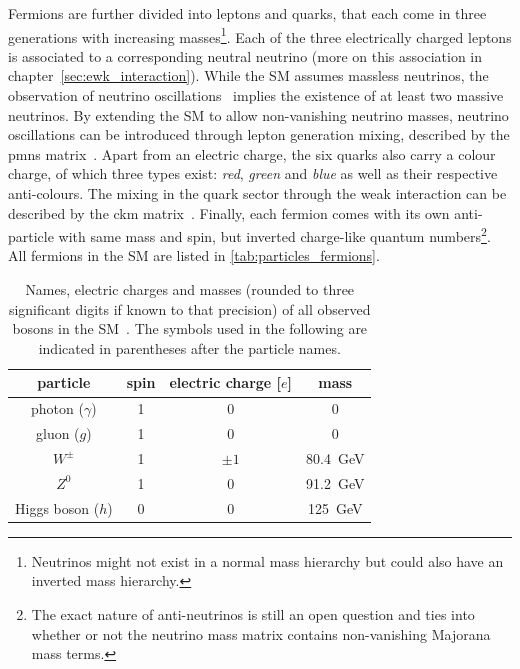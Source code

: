 
Fermions are further divided into leptons and quarks, that each come in three generations with increasing masses\footnote{Neutrinos might not exist in a normal mass hierarchy but could also have an inverted mass hierarchy.}.
Each of the three electrically charged leptons is associated to a corresponding neutral neutrino (more on this association in chapter~\cref{sec:ewk_interaction}). While the SM assumes massless neutrinos, the observation of neutrino oscillations~\cite{Fukuda:1998mi} implies the existence of at least two massive neutrinos.
By extending the SM to allow non-vanishing neutrino masses, neutrino oscillations can be introduced through lepton generation mixing, described by the \gls{pmns} matrix~\cite{PMNS:1962mu}.
Apart from an electric charge, the six quarks also carry a colour charge, of which three types exist: \textit{red}, \textit{green} and \textit{blue} as well as their respective anti-colours.
The mixing in the quark sector through the weak interaction can be described by the \gls{ckm} matrix~\cite{PhysRevLett.10.531,CKM:1973fv}.
Finally, each fermion comes with its own anti-particle with same mass and spin, but inverted charge-like quantum numbers\footnote{The exact nature of anti-neutrinos is still an open question and ties into whether or not the neutrino mass matrix contains non-vanishing Majorana mass terms.}.
All fermions in the SM are listed in \cref{tab:particles_fermions}.


\begin{table}
	\centering
	\setlength\heavyrulewidth{0.2ex}
	\small
	\caption{Names, electric charges and masses (rounded to three significant digits if known to that precision) of all observed bosons in the SM~\cite{pdg2020}. The symbols used in the following are indicated in parentheses after the particle names.}
	\begin{tabular} {c c c c}
	\toprule
		particle & spin & electric charge [$e$]& mass \\ 
	\midrule
		photon ($\gamma$) & 1 & 0 & 0\\
		gluon ($g$) & 1 & 0 & 0 \\
		$W^\pm$ & 1 & $\pm 1$ & \SI{80.4}{\GeV} \\
		$Z^0$ & 1 & 0 & \SI{91.2}{\GeV} \\
		Higgs boson ($h$) & 0 & 0 & \SI{125}{\GeV} \\
	\bottomrule					
	\end{tabular}\vspace{2mm}
	\label{tab:particles_bosons}   
\end{table}

